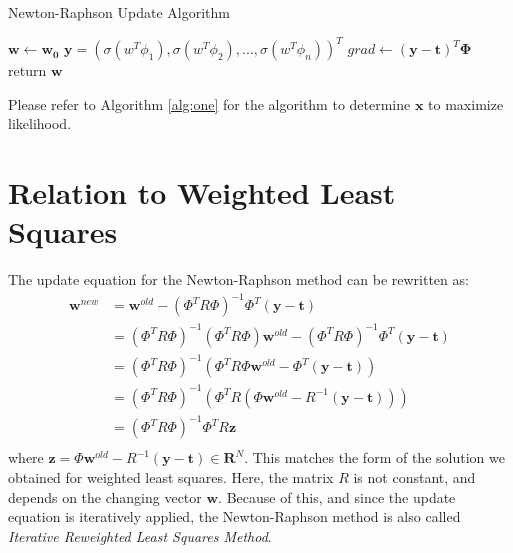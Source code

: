 \documentclass[a4paper, 11pt]{article}
\begin{document}
\begin{algorithm}[!h]
    \CommentSty{\color{blue}}
    \caption{Newton-Raphson Update Algorithm}
    \label{alg:one}
    \vskip 0.5cm
    $\mathbf{w} \gets \mathbf{w_0}$ 
    $\mathbf{y} = (\sigma(w^T\phi_1), \sigma(w^T\phi_2), ..., \sigma(w^T\phi_n))^T$ 
    $grad \gets (\mathbf{y} - \mathbf{t})^T\mathbf{\Phi}$\;
    return $\mathbf{w}$
\end{algorithm}

Please refer to Algorithm \ref{alg:one} for the algorithm to determine $\mathbf{x}$ to maximize likelihood.



\section{Relation to Weighted Least Squares}
The update equation for the Newton-Raphson method can be rewritten as:
\begin{align}
    \textbf{w}^{new} &= \textbf{w}^{old} - (\Phi^T R \Phi)^{-1} \Phi^T  (\textbf{y} - \textbf{t})  \\
    &= (\Phi^T R \Phi)^{-1} (\Phi^T R \Phi)\textbf{w}^{old}  - (\Phi^T R \Phi)^{-1} \Phi^T  (\textbf{y} - \textbf{t}) \\
    &= (\Phi^T R \Phi)^{-1} (\Phi^T R \Phi \textbf{w}^{old} - \Phi^T  (\textbf{y} - \textbf{t}) ) \\
    &= (\Phi^T R \Phi)^{-1} (\Phi^T R (\Phi \textbf{w}^{old} -  R^{-1}(\textbf{y} - \textbf{t}) )) \\
    &= (\Phi^T R \Phi)^{-1} \Phi^T R \textbf{z}\\
\end{align}
where $\textbf{z} = \Phi \textbf{w}^{old} -  R^{-1}(\textbf{y} - \textbf{t}) \in \mathbf{R}^N$. This matches the form of the solution we obtained for weighted least squares. Here, the matrix $R$ is not constant, and depends on 
the changing vector $\textbf{w}$. Because of this, and since the update equation is iteratively applied, the Newton-Raphson method is also called \textit{Iterative Reweighted Least Squares Method}.
\end{document}

